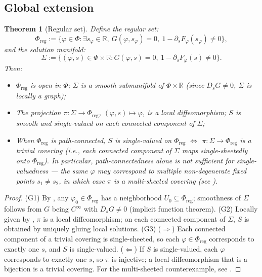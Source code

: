 \documentclass[12pt,letterpaper]{article}
\newtheorem{theorem}{Theorem}[section]
\theoremstyle{definition}
\newcommand{\mPhi}{\Phi}
\newcommand{\mreg}{\mPhi_{\mathrm{reg}}}
\newcommand{\R}{\mathbb{R}}
\begin{document}
\subsection{Global extension}

\begin{theorem}[Regular set]
\label{thm:reg-set}
Define the \emph{regular set}:
\[ \mreg := \{\varphi \in \mPhi : \exists s_\varphi \in \R,\ G(\varphi, s_\varphi) = 0,\ 1 - \partial_s F_\varphi(s_\varphi) \neq 0\}, \]
and the \emph{solution manifold}:
\[ \Sigma := \{(\varphi, s) \in \mPhi \times \R : G(\varphi, s) = 0,\ 1 - \partial_s F_\varphi(s) \neq 0\}. \]
Then:
\begin{itemize}
\item[(G1)] $\mreg$ is open in $\mPhi$; $\Sigma$ is a smooth submanifold of $\mPhi \times \R$ (since $D_s G \neq 0$, $\Sigma$ is locally a graph);
\item[(G2)] The projection $\pi: \Sigma \to \mreg$, $(\varphi, s) \mapsto \varphi$, is a local diffeomorphism; $S$ is smooth and single-valued on each connected component of $\Sigma$;
\item[(G3)] When $\mreg$ is path-connected, $S$ is single-valued on $\mreg$ $\iff$ $\pi: \Sigma \to \mreg$ is a trivial covering (i.e., each connected component of $\Sigma$ maps single-sheetedly onto $\mreg$). In particular, path-connectedness alone is \emph{not} sufficient for single-valuedness --- the same $\varphi$ may correspond to multiple non-degenerate fixed points $s_1 \neq s_2$, in which case $\pi$ is a multi-sheeted covering (see ).
\end{itemize}
\end{theorem}

\begin{proof}
(G1) By , any $\varphi_0 \in \mreg$ has a neighborhood $U_0 \subseteq \mreg$; smoothness of $\Sigma$ follows from $G$ being $C^\infty$ with $D_s G \neq 0$ (implicit function theorem). (G2) Locally given by , $\pi$ is a local diffeomorphism; on each connected component of $\Sigma$, $S$ is obtained by uniquely gluing local solutions. (G3) ($\Rightarrow$) Each connected component of a trivial covering is single-sheeted, so each $\varphi \in \mreg$ corresponds to exactly one $s$, and $S$ is single-valued. ($\Leftarrow$) If $S$ is single-valued, each $\varphi$ corresponds to exactly one $s$, so $\pi$ is injective; a local diffeomorphism that is a bijection is a trivial covering. For the multi-sheeted counterexample, see .
\end{proof}
\end{document}
